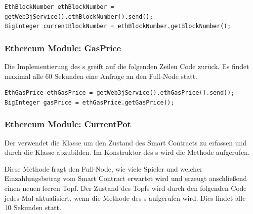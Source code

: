 \begin{lstlisting}[basicstyle=\small]
EthBlockNumber ethBlockNumber = getWeb3jService().ethBlockNumber().send();
BigInteger currentBlockNumber = ethBlockNumber.getBlockNumber();
\end{lstlisting}

\subsubsection{Ethereum Module: GasPrice}

Die Implementierung des s greift auf die folgenden Zeilen Code zurück. Es findet maximal alle 60 Sekunden eine Anfrage an den Full-Node statt.

\begin{lstlisting}[basicstyle=\small]
EthGasPrice ethGasPrice = getWeb3jService().ethGasPrice().send();
BigInteger gasPrice = ethGasPrice.getGasPrice();
\end{lstlisting}


\subsubsection{Ethereum Module: CurrentPot}

Der  verwendet die Klasse  um den Zustand des Smart Contracts zu erfassen und durch die Klasse  abzubilden. Im Konstruktor des s wird die Methode  aufgerufen.



Diese Methode fragt den Full-Node, wie viele Spieler und welcher Einzahlungsbetrag vom Smart Contract erwartet wird und erzeugt anschließend einen neuen leeren Topf. Der Zustand des Topfs wird durch den folgenden Code jedes Mal aktualisiert, wenn die  Methode des s aufgerufen wird. Dies findet alle 10 Sekunden statt.



